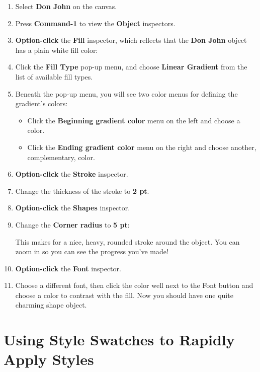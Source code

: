 \documentclass[../main.tex]{subfiles}
\begin{document}
\begin{enumerate}
  \item Select \textbf{Don John} on the canvas.
  \item Press \textbf{Command-1} to view the \textbf{Object} inspectors.
  \item \textbf{Option-click} the \textbf{Fill} inspector, which reflects that the \textbf{Don
    John} object has a plain white fill color:

  \item Click the \textbf{Fill Type} pop-up menu, and choose \textbf{Linear Gradient} from the
    list of available fill types.
  \item Beneath the pop-up menu, you will see two color menus for defining the gradient's
    colors:

    \begin{itemize}
      \item Click the \textbf{Beginning gradient color} menu on the left and choose a color.
      \item Click the \textbf{Ending gradient color} menu on the right and choose another,
        complementary, color.
    \end{itemize}

  \item \textbf{Option-click} the \textbf{Stroke} inspector.
  \item Change the thickness of the stroke to \textbf{2 pt}.
  \item \textbf{Option-click} the \textbf{Shapes} inspector.
  \item Change the \textbf{Corner radius} to \textbf{5 pt}:


    This makes for a nice, heavy, rounded stroke around the object. You can zoom in so you can see
    the progress you've made!
  \item \textbf{Option-click} the \textbf{Font} inspector.
  \item Choose a different font, then click the color well next to the Font button and choose a
    color to contrast with the fill. Now you should have one quite charming shape object.

\end{enumerate}

\section{Using Style Swatches to Rapidly Apply Styles}
\end{document}
